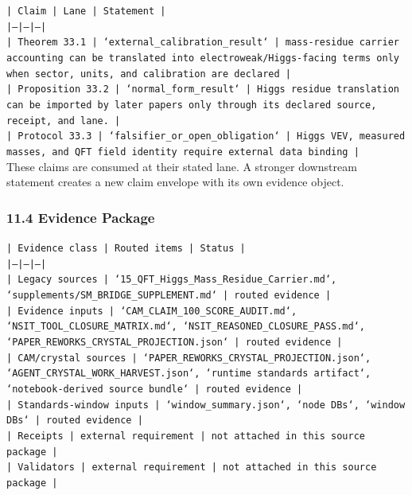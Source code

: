 \documentclass[11pt]{article}
\begin{document}
\noindent\texttt{| Claim | Lane | Statement |}\\
\noindent\texttt{|---|---|---|}\\
\noindent\texttt{| Theorem 33.1 | `external\_calibration\_result` | mass-residue carrier accounting can be translated into electroweak/Higgs-facing terms only when sector, units, and calibration are declared |}\\
\noindent\texttt{| Proposition 33.2 | `normal\_form\_result` | Higgs residue translation can be imported by later papers only through its declared source, receipt, and lane. |}\\
\noindent\texttt{| Protocol 33.3 | `falsifier\_or\_open\_obligation` | Higgs VEV, measured masses, and QFT field identity require external data binding |}\\

These claims are consumed at their stated lane. A stronger downstream statement
creates a new claim envelope with its own evidence object.

\subsubsection*{11.4 Evidence Package}

\noindent\texttt{| Evidence class | Routed items | Status |}\\
\noindent\texttt{|---|---|---|}\\
\noindent\texttt{| Legacy sources | `15\_QFT\_Higgs\_Mass\_Residue\_Carrier.md`, `supplements/SM\_BRIDGE\_SUPPLEMENT.md` | routed evidence |}\\
\noindent\texttt{| Evidence inputs | `CAM\_CLAIM\_100\_SCORE\_AUDIT.md`, `NSIT\_TOOL\_CLOSURE\_MATRIX.md`, `NSIT\_REASONED\_CLOSURE\_PASS.md`, `PAPER\_REWORKS\_CRYSTAL\_PROJECTION.json` | routed evidence |}\\
\noindent\texttt{| CAM/crystal sources | `PAPER\_REWORKS\_CRYSTAL\_PROJECTION.json`, `AGENT\_CRYSTAL\_WORK\_HARVEST.json`, `runtime standards artifact`, `notebook-derived source bundle` | routed evidence |}\\
\noindent\texttt{| Standards-window inputs | `window\_summary.json`, `node DBs`, `window DBs` | routed evidence |}\\
\noindent\texttt{| Receipts | external requirement | not attached in this source package |}\\
\noindent\texttt{| Validators | external requirement | not attached in this source package |}\\
\end{document}
